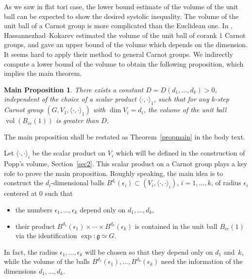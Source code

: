 \documentclass[10pt,a4paper]{amsart}
\numberwithin{equation}{section}
\newtheorem*{main}{Main Proposition}
 { \theoremstyle{definition}
\newtheorem{Definition}[Theorem]{Definition}
\newtheorem{Note}[Theorem]{Note}
\newtheorem{Example}[Theorem]{Example}
\newtheorem{Remark}[Theorem]{Remark} }
\newcommand{\g}{\mathfrak{g}}
\begin{document}
As we saw in flat tori case,
the lower bound estimate of the volume of the unit ball can be expected to show the desired systolic inequality.
The volume of the unit ball of a Carnot group is more complicated than the Euclidean one.
In \cite{has},
Hassannezhad--Kokarev estimated the volume of the unit ball of corank $1$ Carnot groups,
and gave an upper bound of the volume which depends on the dimension.
It seems hard to apply their method to general Carnot groups.
We indirectly compute a lower bound of the volume to obtain the following proposition,
which implies the main theorem.

\begin{main}
 There exists a constant $D=D(d_1,\dots,d_k)>0$,
 independent of the choice of a scalar product $\langle\cdot,\cdot\rangle_1$,
 such that for any $k$-step Carnot group $(G,V_1,\langle\cdot,\cdot\rangle_1)$ with $\dim V_i=d_i$,
 the volume of the unit ball $\operatorname{vol}(B_{cc}(1))$ is greater than $D$.
\end{main}

The main proposition shall be restated as Theorem~\ref{propmain} in the body text.


Let $\langle\cdot,\cdot\rangle_i$ be the scalar product on $V_i$ which will be defined in the construction of Popp's volume,
Section~\ref{sec2}.
This scalar product on a Carnot group plays a key role to prove the main proposition.
Roughly speaking,
the main idea is to construct the $d_i$-dimensional balls $B^{d_i}(\epsilon_i)\subset (V_i,\langle\cdot,\cdot\rangle_i)$, $i=1,\dots,k$, of radius $\epsilon_i$ centered at $0$ such that
\begin{itemize}\itemsep=0pt
 \item[$1)$] the numbers $\epsilon_1,\dots,\epsilon_k$ depend only on $d_1,\dots,d_k$,
 \item[$2)$] their product $B^{d_1}(\epsilon_1)\times{}\cdots {}\times B^{d_k}(\epsilon_k)$
 is contained in the unit ball $B_{cc}(1)$ via the identification $\exp\colon \g\simeq G$.
\end{itemize}

\begin{Remark}\label{rmk11}
 In fact,
 the radius $\epsilon_1,\dots,\epsilon_k$ will be chosen so that they depend only on $d_1$ and~$k$,
 while the volume of the balls $B^{d_1}(\epsilon_1),\dots,B^{d_k}(\epsilon_k)$ need the information of the dimensions $d_1,\dots,d_k$.
\end{Remark}
\end{document}
